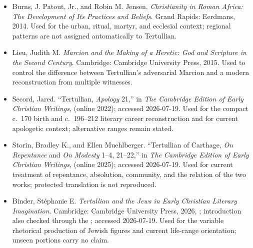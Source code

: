 \begin{itemize}
\item Burns, J. Patout, Jr., and Robin M. Jensen. \emph{Christianity in Roman
Africa: The Development of Its Practices and Beliefs}. Grand Rapids: Eerdmans,
2014. Used for the urban, ritual, martyr, and ecclesial context; regional
patterns are not assigned automatically to Tertullian.

\item Lieu, Judith M. \emph{Marcion and the Making of a Heretic: God and
Scripture in the Second Century}. Cambridge: Cambridge University Press, 2015.
Used to control the difference between Tertullian's adversarial Marcion and a
modern reconstruction from multiple witnesses.

\item Secord, Jared. ``Tertullian, \emph{Apology} 21,'' in \emph{The Cambridge
Edition of Early Christian Writings},
 (online 2022);
accessed 2026-07-19. Used for the compact c.~170 birth and c.~196--212 literary
career reconstruction and for current apologetic context; alternative ranges
remain stated.

\item Storin, Bradley K., and Ellen Muehlberger. ``Tertullian of Carthage,
\emph{On Repentance} and \emph{On Modesty} 1--4, 21--22,'' in \emph{The
Cambridge Edition of Early Christian Writings},
 (online 2025);
accessed 2026-07-19. Used for current treatment of repentance, absolution,
community, and the relation of the two works; protected translation is not
reproduced.

\item Binder, St\'ephanie E. \emph{Tertullian and the Jews in Early Christian
Literary Imagination}. Cambridge: Cambridge University Press, 2026,
; introduction also
checked through the
; accessed 2026-07-19. Used for
the variable rhetorical production of Jewish figures and current life-range
orientation; unseen portions carry no claim.


\end{itemize}
